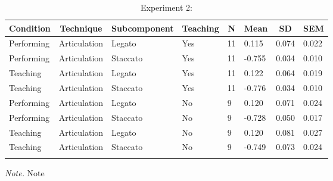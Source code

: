 \documentclass[
  man,floatsintext]{apa6}
\begin{document}
\begin{table}[tbp]

\begin{center}
\begin{threeparttable}

\caption{\label{tab:art-teaching-desc-2}Experiment 2:}

\begin{tabular}{llllllll}
\toprule
Condition & \multicolumn{1}{c}{Technique} & \multicolumn{1}{c}{Subcomponent} & \multicolumn{1}{c}{Teaching} & \multicolumn{1}{c}{N} & \multicolumn{1}{c}{Mean} & \multicolumn{1}{c}{SD} & \multicolumn{1}{c}{SEM}\\
\midrule
Performing & Articulation & Legato & Yes & 11 & 0.115 & 0.074 & 0.022\\
Performing & Articulation & Staccato & Yes & 11 & -0.755 & 0.034 & 0.010\\
Teaching & Articulation & Legato & Yes & 11 & 0.122 & 0.064 & 0.019\\
Teaching & Articulation & Staccato & Yes & 11 & -0.776 & 0.034 & 0.010\\
Performing & Articulation & Legato & No & 9 & 0.120 & 0.071 & 0.024\\
Performing & Articulation & Staccato & No & 9 & -0.728 & 0.050 & 0.017\\
Teaching & Articulation & Legato & No & 9 & 0.120 & 0.081 & 0.027\\
Teaching & Articulation & Staccato & No & 9 & -0.749 & 0.073 & 0.024\\
\bottomrule
\addlinespace
\end{tabular}

\begin{tablenotes}[para]
\normalsize{\textit{Note.} Note}
\end{tablenotes}

\end{threeparttable}
\end{center}

\end{table}
\end{document}
